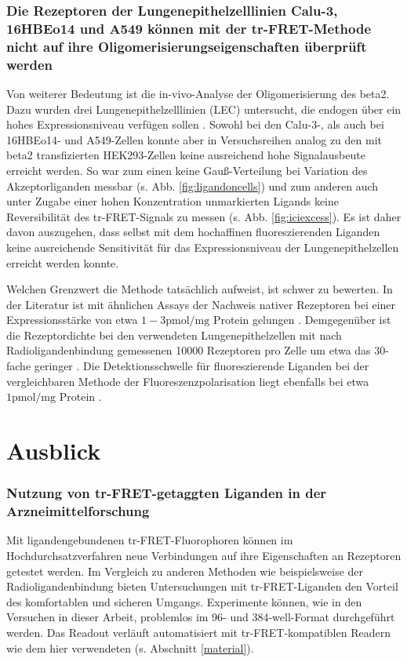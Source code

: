 \subsubsection{Die Rezeptoren der Lungenepithelzelllinien Calu-3, 16HBEo14 und A549 können mit der tr-FRET-Methode nicht auf ihre Oligomerisierungseigenschaften überprüft werden}
Von weiterer Bedeutung ist die in-vivo-Analyse der Oligomerisierung des \gls{beta2}. Dazu wurden drei Lungenepithelzelllinien (LEC) untersucht, die endogen über ein hohes Expressionsniveau verfügen sollen \parencite{Abraham2004}. Sowohl bei den Calu-3-, als auch bei 16HBEo14- und A549-Zellen konnte aber in Versuchsreihen analog zu den mit \gls{beta2} transfizierten HEK293-Zellen keine ausreichend hohe Signalausbeute erreicht werden. So war zum einen keine Gauß-Verteilung  bei Variation des Akzeptorliganden messbar (s. Abb. \ref{fig:ligandoncells}) und zum anderen auch unter Zugabe einer hohen Konzentration unmarkierten Ligands keine Reversibilität des tr-FRET-Signals zu messen (s. Abb. \ref{fig:iciexcess}). Es ist daher davon auszugehen, dass selbst mit dem hochaffinen fluoreszierenden Liganden keine ausreichende Sensitivität für das Expressionsniveau der Lungenepithelzellen erreicht werden konnte. 

Welchen Grenzwert die Methode tatsächlich aufweist, ist schwer zu bewerten. In der Literatur ist mit ähnlichen Assays der Nachweis nativer Rezeptoren bei einer Expressionsstärke von etwa $1-3 \si{\pico \mol / \milli\gram}$ Protein gelungen \parencite{Albizu2010}. Demgegenüber ist die Rezeptordichte bei den verwendeten Lungenepithelzellen mit nach Radioligandenbindung gemessenen 10000 Rezeptoren pro Zelle um etwa das 30-fache geringer \parencite{Abraham2004}. Die Detektionsschwelle für fluoreszierende Liganden bei der vergleichbaren Methode der Fluoreszenzpolarisation liegt ebenfalls bei etwa $1 \si{\pico \mol / \milli\gram}$ Protein \parencite{Gagne2002, DeJong2005}. 

\section{Ausblick}
\subsubsection{Nutzung von tr-FRET-getaggten Liganden in der Arzneimittelforschung}
Mit ligandengebundenen tr-FRET-Fluorophoren können im Hochdurchsatzverfahren neue Verbindungen auf ihre Eigenschaften an Rezeptoren getestet werden. Im Vergleich zu anderen Methoden wie beispielsweise der Radioligandenbindung bieten Untersuchungen mit tr-FRET-Liganden den Vorteil des komfortablen und sicheren Umgangs. Experimente können, wie in den Versuchen in dieser Arbeit, problemlos im 96- und 384-well-Format durchgeführt werden. Das Readout verläuft automatisiert mit tr-FRET-kompatiblen Readern wie dem hier verwendeten (s. Abschnitt \ref{material}).

